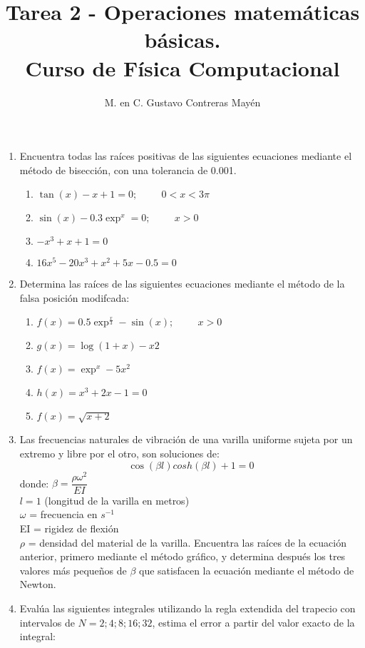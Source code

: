 \documentclass[11pt]{article}
\title{Tarea 2 - Operaciones matemáticas básicas. \\ Curso de Física Computacional}
\author{M. en C. Gustavo Contreras Mayén}
\date{ }
\begin{document}
\maketitle
\begin{enumerate}
\item Encuentra todas las raíces positivas de las siguientes ecuaciones mediante el método de bisección, con una tolerancia de 0.001.
\begin{enumerate}
\item $\tan(x) - x + 1 = 0; \hspace{1cm} 0 < x < 3\pi$
\item $\sin(x) - 0.3 \exp^{x} = 0; \hspace{1cm} x > 0$
\item $-x^{3} + x + 1 = 0$
\item $16x^{5} - 20x^{3} + x^{2} + 5x - 0.5 = 0$
\end{enumerate}
\item Determina las raíces de las siguientes ecuaciones mediante el método de la falsa posición modifcada:
\begin{enumerate}
\item $f(x) = 0.5\exp^{\frac{x}{3}}- \sin(x); \hspace{1cm} x > 0$
\item $g(x) = \log(1 + x) - x2$
\item $f(x) = \exp^{x} - 5x^{2}$
\item $h(x) = x^{3} + 2x - 1 = 0$
\item $f(x) = \sqrt{x+2}$
\end{enumerate}
\item Las frecuencias naturales de vibración de una varilla uniforme sujeta por un extremo y libre por el otro, son soluciones de:
\[ \cos(\beta l)cosh(\beta l) + 1 = 0 \]
donde:
$\beta = \dfrac{\rho \omega^{2}}{EI}$ \\
$l = 1$ (longitud de la varilla en metros) \\
$\omega$ = frecuencia en $s^{-1}$ \\
EI = rigidez de flexión \\
$\rho$ = densidad del material de la varilla.
Encuentra las raíces de la ecuación anterior, primero mediante el método gráfico, y determina después los
tres valores más pequeños de $\beta$ que satisfacen la ecuación mediante el método de Newton.
\item Evalúa las siguientes integrales utilizando la regla extendida del trapecio con intervalos de $N =
2; 4; 8; 16; 32$, estima el error a partir del valor exacto de la integral:

\end{enumerate}
\end{document}
